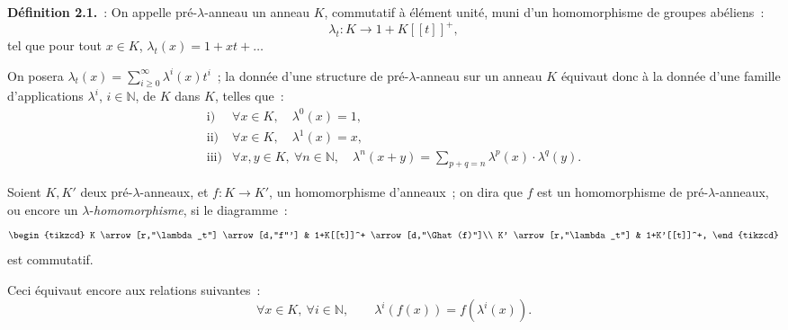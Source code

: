 \textbf{Définition 2.1.}~: On appelle pré-\(\lambda\)-anneau un anneau \(K\), commutatif à élément unité, muni d'un homomorphisme de groupes abéliens~:
\[
  \lambda_t:K\longrightarrow1+K[[t]]^+,
\]
tel que pour tout \(x\in K\), \(\lambda_t(x)=1+xt+\ldots\)

On posera \(\lambda_t(x)=\sum_{i\geq0}^{\infty}\lambda^i(x)t^i\)~; la donnée d'une structure de pré-\(\lambda\)-anneau sur un anneau \(K\) équivaut donc à la donnée d'une famille d'applications \(\lambda^i\), \(i\in\mathbb N\), de \(K\) dans \(K\), telles que~:
\[
\begin{array}{ll}
\text{i)}& \forall x\in K,\quad \lambda^0(x)=1,\\[0.3em]
\text{ii)}& \forall x\in K,\quad \lambda^1(x)=x,\\[0.3em]
\text{iii)}& \forall x,y\in K,\ \forall n\in\mathbb N,\quad
\lambda^n(x+y)=\displaystyle\sum_{p+q=n}\lambda^p(x)\cdot\lambda^q(y).
\end{array}
\]

Soient \(K,K'\) deux pré-\(\lambda\)-anneaux, et \(f:K\to K'\), un homomorphisme d'anneaux~; on dira que \(f\) est un homomorphisme de pré-\(\lambda\)-anneaux, ou encore un \(\lambda\)-\emph{homomorphisme}, si le diagramme~:
\[
\begin{tikzcd}
K \arrow[r,"\lambda_t"] \arrow[d,"f"'] &
1+K[[t]]^+ \arrow[d,"\Ghat(f)"]\\
K' \arrow[r,"\lambda_t"] &
1+K'[[t]]^+,
\end{tikzcd}
\]
est commutatif.

Ceci équivaut encore aux relations suivantes~:
\[
  \forall x\in K,\ \forall i\in\mathbb N,\qquad
  \lambda^i(f(x))=f(\lambda^i(x)).
\]


